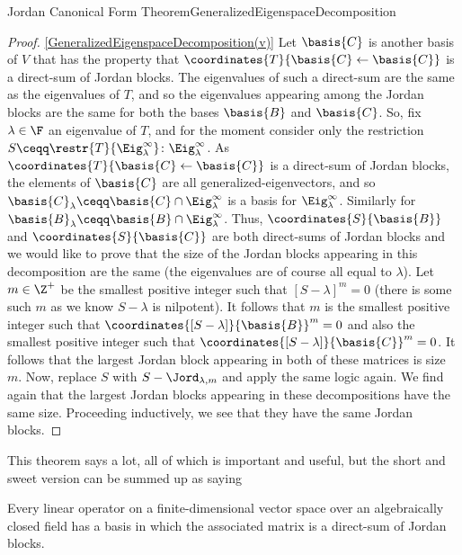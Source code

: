 \begin{thm}{Jordan Canonical Form Theorem}{GeneralizedEigenspaceDecomposition}
\begin{proof}
		\blni
		\cref{GeneralizedEigenspaceDecomposition(v)} Let $\basis{C}$ is another basis of $V$ that has the property that $\coordinates{T}{\basis{C}\leftarrow \basis{C}}$ is a direct-sum of Jordan blocks.  The eigenvalues of such a direct-sum are the same as the eigenvalues of $T$, and so the eigenvalues appearing among the Jordan blocks are the same for both the bases $\basis{B}$ and $\basis{C}$.  So, fix $\lambda \in \F$ an eigenvalue of $T$, and for the moment consider only the restriction $S\ceqq \restr{T}{\Eig _{\lambda}^{\infty}}\colon \Eig _{\lambda}^{\infty}$.  As $\coordinates{T}{\basis{C}\leftarrow \basis{C}}$ is a direct-sum of Jordan blocks, the elements of $\basis{C}$ are all generalized-eigenvectors, and so $\basis{C}_{\lambda}\ceqq \basis{C}\cap \Eig _{\lambda}^{\infty}$ is a basis for $\Eig _{\lambda}^{\infty}$.  Similarly for $\basis{B}_{\lambda}\ceqq \basis{B}\cap \Eig _{\lambda}^{\infty}$.  Thus, $\coordinates{S}{\basis{B}}$ and $\coordinates{S}{\basis{C}}$ are both direct-sums of Jordan blocks and we would like to prove that the size of the Jordan blocks appearing in this decomposition are the same (the eigenvalues are of course all equal to $\lambda$).  Let $m\in \Z ^+$ be the smallest positive integer such that $[S-\lambda ]^m=0$ (there is some such $m$ as we know $S-\lambda$ is nilpotent).  It follows that $m$ is the smallest positive integer such that $\coordinates{[S-\lambda ]}{\basis{B}}^m=0$ and also the smallest positive integer such that $\coordinates{[S-\lambda ]}{\basis{C}}^m=0$.  It follows that the largest Jordan block appearing in both of these matrices is size $m$.  Now, replace $S$ with $S-\Jord _{\lambda ,m}$ and apply the same logic again.  We find again that the largest Jordan blocks appearing in these decompositions have the same size.  Proceeding inductively, we see that they have the same Jordan blocks.
	\end{proof}
\end{thm}
This theorem says a lot, all of which is important and useful, but the short and sweet version can be summed up as saying
\begin{important}
	Every linear operator on a finite-dimensional vector space over an algebraically closed field has a basis in which the associated matrix is a direct-sum of Jordan blocks.
\end{important}

